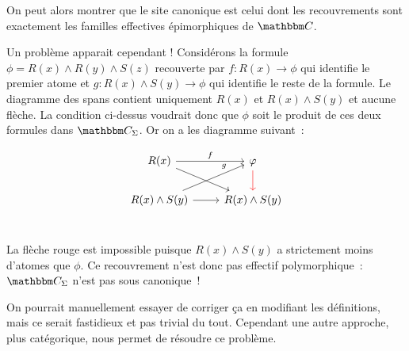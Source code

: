 On peut alors montrer que le site canonique est celui dont les recouvrements sont
exactement les familles effectives épimorphiques de $\C$.

Un problème apparait cependant ! Considérons la formule $\phi=R(x)\wedge R(y)\wedge S(z)$
recouverte par $f:R(x)\rightarrow\phi$ qui identifie le premier atome et
$g:R(x)\wedge S(y)\rightarrow\phi$ qui identifie le reste de la formule. Le diagramme
des spans contient uniquement $R(x)$ et $R(x)\wedge S(y)$ et aucune flèche. La
condition ci-dessus voudrait donc que $\phi$ soit le produit de ces deux formules dans
$\C_\Sigma$. Or on a les diagramme suivant~:

\[\begin{tikzcd}
    R(x) \arrow[r, "f"] \arrow[rd] & \phi \arrow[d, red] \\
    R(x)\wedge S(y) \arrow[ru, near end, "g"] \arrow[r] & R(x)\wedge S(y) \\
\end{tikzcd}\]

La flèche rouge est impossible puisque $R(x)\wedge S(y)$ a strictement moins d'atomes
que $\phi$. Ce recouvrement n'est donc pas effectif polymorphique~: $\C_\Sigma$ n'est pas
sous canonique~!

On pourrait manuellement essayer de corriger ça en modifiant les définitions, mais ce
serait fastidieux et pas trivial du tout. Cependant une autre approche, plus catégorique,
nous permet de résoudre ce problème.

